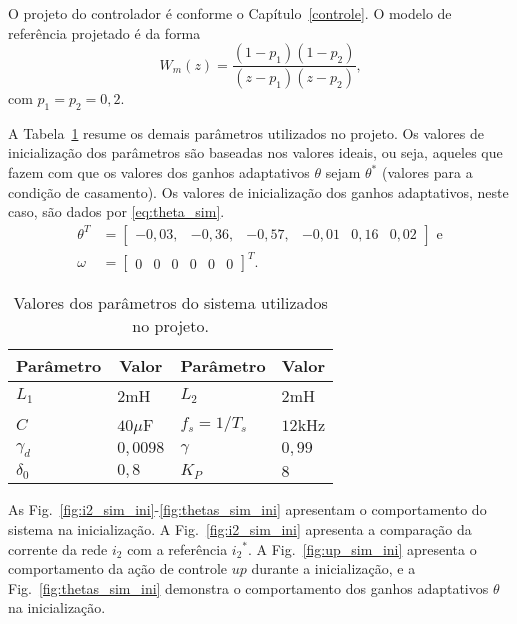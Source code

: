   O projeto do controlador é conforme o Capítulo~\ref{controle}. O modelo de referência projetado é da forma
  \begin{equation}
    W_m(z) = \frac{(1-p_1)(1-p_2)}{(z-p_1)(z-p_2)}\text{,}
    \label{eq:wm_simulacao}
  \end{equation}
  com $p_1 = p_2 = 0,2$.

	A Tabela~\ref{tab:parametros_projeto} resume os demais parâmetros utilizados no projeto. Os valores de inicialização dos parâmetros são baseadas nos valores ideais, ou seja, aqueles que fazem com que os valores dos ganhos adaptativos $\theta$ sejam $\theta^*$ (valores para a condição de casamento). Os valores de inicialização dos ganhos adaptativos, neste caso, são dados por \ref{eq:theta_sim}.
  \begin{equation}
    \begin{split}
      \theta^T & = \left[ \begin{matrix} -0,03, & -0,36, & -0,57, & -0,01 & 0,16 & 0,02 \end{matrix} \right]\text{ e}\\
      \omega & = {\left[ \begin{matrix} 0 & 0 & 0 & 0 & 0 & 0 \end{matrix} \right]}^T\text{.}
    \end{split}
    \label{eq:theta_sim}
  \end{equation}

  \begin{table}[htb]
    \renewcommand{\arraystretch}{1.35}
    \setlength{\tabcolsep}{1.2mm}
    \caption{Valores dos parâmetros do sistema utilizados no projeto.}
    \label{tab:parametros_projeto}
    \centering
    \begin{tabular}{l l l l}
      \hline
      \multicolumn{1}{c}{Parâmetro} & \multicolumn{1}{c}{Valor} &
      \multicolumn{1}{c}{Parâmetro} & \multicolumn{1}{c}{Valor} \\
      \hline
      $L_1$      & $2$mH    & $L_2$         & $2$mH   \\
      $C$        & $40\mu$F & $f_s = 1/T_s$ & $12$kHz \\
      $\gamma_d$ & $0,0098$ & $\gamma$      & $0,99$  \\
      $\delta_0$ & $0,8$    & $K_P$         & $8$     \\
      \hline
    \end{tabular}
  \end{table}

  As Fig.~\ref{fig:i2_sim_ini}-\ref{fig:thetas_sim_ini} apresentam o comportamento do sistema na inicialização. A Fig.~\ref{fig:i2_sim_ini} apresenta a comparação da corrente da rede $i_2$ com a referência ${i_2}^*$. A Fig.~\ref{fig:up_sim_ini} apresenta o comportamento da ação de controle $up$ durante a inicialização, e a Fig.~\ref{fig:thetas_sim_ini} demonstra o comportamento dos ganhos adaptativos $\theta$ na inicialização.

